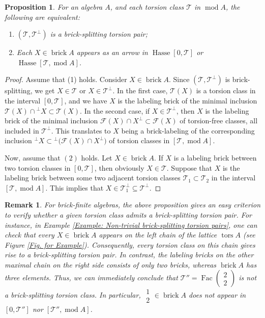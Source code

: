\documentclass{amsart}
\theoremstyle{thmstyle}
\newtheorem{proposition}[thm]{Proposition}
\theoremstyle{exstyle}
\theoremstyle{defstyle}
\theoremstyle{remstyle}
\newtheorem{remark}[thm]{Remark}
\theoremstyle{remstyle}
\newcommand{\Fac}{\operatorname{Fac}}
\DeclareMathOperator*{\modu}{mod}
\DeclareMathOperator*{\brick}{brick}
\DeclareMathOperator*{\tors}{tors}
\DeclareMathOperator*{\Hasse}{Hasse}
\begin{document}
\begin{proposition}\label{Prop: brick-splitting and intervals}
For an algebra $A$, and each torsion class $\mathcal{T}$ in $\modu A$, the following are equivalent:
\begin{enumerate}
    \item $(\mathcal{T}, \mathcal{T}^\perp)$ is a brick-splitting torsion pair;
    \item Each $X\in \brick A$ appears as an arrow in $\Hasse [0,\mathcal{T}]$ or $\Hasse[\mathcal{T}, \modu A]$.
\end{enumerate}
\end{proposition}
\begin{proof}
Assume that (1) holds. Consider $X \in \brick A$. Since $(\mathcal{T}, \mathcal{T}^\perp)$ is brick-splitting, we get $X \in \mathcal{T}$ or $X \in \mathcal{T}^\perp$. In the first case, $\mathcal{T}(X)$ is a torsion class in the interval $[0, \mathcal{T}]$, and we have $X$ is the labeling brick of the minimal inclusion $\mathcal{T}(X) \cap{}^\perp X \subset \mathcal{T}(X)$. In the second case, if $X \in \mathcal{T}^\perp$, then $X$ is the labeling brick of the minimal inclusion $\mathcal{F}(X) \cap X^\perp \subset \mathcal{F}(X)$ of torsion-free classes, all included in $\mathcal{T}^\perp$. This translates to $X$ being a brick-labeling of the corresponding inclusion $^\perp X \subset {^\perp(\mathcal{F}(X) \cap X^\perp})$ of torsion classes in  $[\mathcal{T},\modu A]$. 

Now, assume that $(2)$ holds. Let $X \in \brick A$. If $X$ is a labeling brick between two torsion classes in $[0, \mathcal{T}]$, then obviously $X \in \mathcal{T}$. Suppose that $X$ is the labeling brick between some two adjacent torsion classes $\mathcal{T}_1 \subset \mathcal{T}_2$ in the interval $[\mathcal{T}, \modu A]$. This implies that $X \in \mathcal{T}_1^\perp \subseteq \mathcal{T}^\perp$.
\end{proof}

\begin{remark}
For brick-finite algebras, the above proposition gives an easy criterion to verify whether a given torsion class admits a brick-splitting torsion pair. 
For instance, in Example \ref{Example: Non-trivial brick-splitting torsion pairs}, one can check that every $X\in\brick A$ appears on the left chain of the lattice $\tors A$ (see Figure \ref{Fig. for Example}). Consequently, every torsion class on this chain gives rise to a brick-splitting torsion pair. In contrast, the labeling bricks on the other maximal chain on the right side consists of only two bricks, whereas $\brick A$ has three elements. Thus, we can immediately conclude that $\mathcal{T}''=\Fac(\begin{smallmatrix} 2\\2\end{smallmatrix})$ is not a brick-splitting torsion class. In particular, ${\begin{smallmatrix} 1\\2\end{smallmatrix}} \in \brick A$ does not appear in $[0,\mathcal{T}'']$ nor $[\mathcal{T}'',\modu A]$.
\end{remark}
\end{document}
